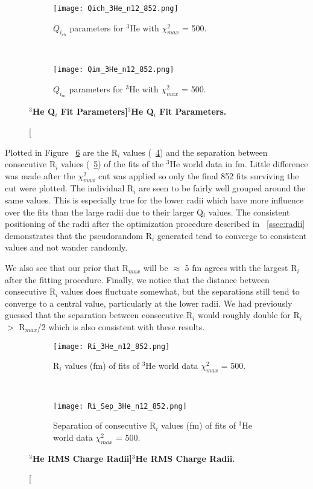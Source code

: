 \begin{figure}[!ht]
\begin{subfigure}{1.\textwidth}
  \centering
  \texttt{[image: Qich\_3He\_n12\_852.png]}
  \caption{$Q_{i_{ch}}$ parameters for $^3$He with $\chi^2_{max}$ = 500.}
  \label{fig:3he_qch}
\end{subfigure}\\
\begin{subfigure}{1.\textwidth}
  \centering
  \texttt{[image: Qim\_3He\_n12\_852.png]}
  \caption{$Q_{i_{m}}$ parameters for $^3$He with $\chi^2_{max}$ = 500.}
  \label{fig:3he_qm}
\end{subfigure}
\caption[\bf{$^3$He Q$_i$ Fit Parameters}]{\bf{$^3$He Q$_i$ Fit Parameters.}}
\label{fig:3he_qi}
\end{figure}

Plotted in Figure ~\ref{fig:3he_ri} are the R$_i$ values (~\ref{fig:3he_ri_ind}) and the separation between consecutive R$_i$ values (~\ref{fig:3he_ri_sep}) of the fits of the $^3$He world data in fm. Little difference was made after the $\chi^2_{max}$ cut was applied so only the final 852 fits surviving the cut were plotted. The individual R$_i$ are seen to be fairly well grouped around the same values. This is especially true for the lower radii which have more influence over the fits than the large radii due to their larger Q$_i$ values. The consistent positioning of the radii after the optimization procedure described in ~\ref{ssec:radii} demonstrates that the pseudorandom R$_i$ generated tend to converge to consistent values and not wander randomly. 

We also see that our prior that R$_{max}$ will be $\approx$ 5 fm agrees with the largest R$_i$ after the fitting procedure. Finally, we notice that the distance between consecutive R$_i$ values does fluctuate somewhat, but the separations still tend to converge to a central value, particularly at the lower radii. We had previously guessed that the separation between consecutive R$_i$ would roughly double for R$_i$ $>$ R$_{max}$/2 which is also consistent with these results.

\begin{figure}[!ht]
\begin{subfigure}{1.\textwidth}
  \centering
  \texttt{[image: Ri\_3He\_n12\_852.png]}
  \caption{R$_i$ values (fm) of fits of $^3$He world data $\chi^2_{max}$ = 500.}
  \label{fig:3he_ri_ind}
\end{subfigure}\\
\begin{subfigure}{1.\textwidth}
  \centering
  \texttt{[image: Ri\_Sep\_3He\_n12\_852.png]}
  \caption{Separation of consecutive R$_i$ values (fm) of fits of $^3$He world data $\chi^2_{max}$ = 500.}
  \label{fig:3he_ri_sep}
\end{subfigure}
\caption[\bf{$^3$He RMS Charge Radii}]{\bf{$^3$He RMS Charge Radii.}}
\label{fig:3he_ri}
\end{figure}

